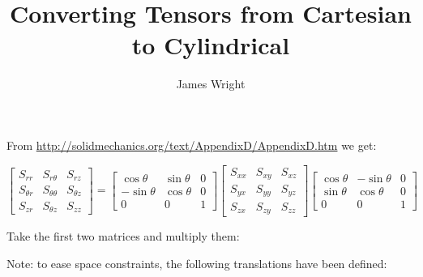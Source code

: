 \documentclass{article}
\author{James Wright}
\begin{document}
\title{Converting Tensors from Cartesian to Cylindrical}
\maketitle
\doclicenseThis{}

From \url{http://solidmechanics.org/text/AppendixD/AppendixD.htm} we get:

\begin{equation}
    \begin{bmatrix}
    S_{rr} & S_{r\theta} & S_{rz} \\
    S_{\theta r} & S_{\theta\theta} & S_{\theta z} \\
    S_{zr} & S_{\theta z} & S_{zz}
    \end{bmatrix}
    =
    \begin{bmatrix}
        \cos \theta & \sin \theta & 0\\
        -\sin \theta & \cos \theta & 0 \\
        0 & 0 & 1
    \end{bmatrix}
    \begin{bmatrix}
    S_{xx} & S_{xy} & S_{xz} \\
    S_{yx} & S_{yy} & S_{yz} \\
    S_{zx} & S_{zy} & S_{zz}
    \end{bmatrix}
    \begin{bmatrix}
        \cos \theta & -\sin \theta & 0\\
        \sin \theta & \cos \theta & 0 \\
        0 & 0 & 1
    \end{bmatrix}
\end{equation}

Take the first two matrices and multiply them:

Note: to ease space constraints, the following translations have been defined:
\end{document}
